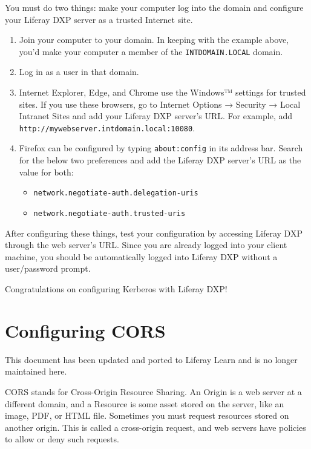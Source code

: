 You must do two things: make your computer log into the domain and
configure your Liferay DXP server as a trusted Internet site.

\begin{enumerate}
\def\labelenumi{\arabic{enumi}.}
\item
  Join your computer to your domain. In keeping with the example above,
  you'd make your computer a member of the \texttt{INTDOMAIN.LOCAL}
  domain.
\item
  Log in as a user in that domain.
\item
  Internet Explorer, Edge, and Chrome use the Windows™ settings for
  trusted sites. If you use these browsers, go to Internet Options →
  Security → Local Intranet Sites and add your Liferay DXP server's URL.
  For example, add \texttt{http://mywebserver.intdomain.local:10080}.
\item
  Firefox can be configured by typing \texttt{about:config} in its
  address bar. Search for the below two preferences and add the Liferay
  DXP server's URL as the value for both:

  \begin{itemize}
  \tightlist
  \item
    \texttt{network.negotiate-auth.delegation-uris}
  \item
    \texttt{network.negotiate-auth.trusted-uris}
  \end{itemize}
\end{enumerate}

After configuring these things, test your configuration by accessing
Liferay DXP through the web server's URL. Since you are already logged
into your client machine, you should be automatically logged into
Liferay DXP without a user/password prompt.

Congratulations on configuring Kerberos with Liferay DXP!

\chapter{Configuring CORS}\label{configuring-cors}

{This document has been updated and ported to Liferay Learn and is no
longer maintained here.}

CORS stands for Cross-Origin Resource Sharing. An Origin is a web server
at a different domain, and a Resource is some asset stored on the
server, like an image, PDF, or HTML file. Sometimes you must request
resources stored on another origin. This is called a cross-origin
request, and web servers have policies to allow or deny such requests.

